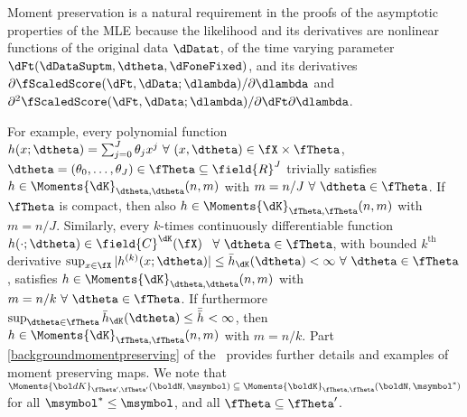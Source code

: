 Moment preservation is a natural requirement in the proofs of the asymptotic properties of the MLE because the likelihood and its derivatives are nonlinear functions of the original data $\dDatat$, of the time varying parameter $\dFt(\dDataSuptm,\dtheta,\dFoneFixed)$, and its derivatives $\partial\fScaledScore(\dFt,\dData;\dlambda)/\partial\dlambda$
and
$\partial^2\fScaledScore(\dFt,\dData;\dlambda)/\partial\dFt\partial\dlambda$.


For example, every polynomial function  $h(x;\dtheta)=\sum_{j=0}^{J} \theta_{j}x^{j} \ \forall \ (x,\dtheta) \in \fX \times \fTheta$, $\dtheta=(\theta_{0},\ldots,\theta_{J}) \in \fTheta \subseteq \field{R}^{J}$ trivially satisfies $h \in \Moments{\dK}_{\dtheta,\dtheta}(n,m)$  with $m=n/J\ \forall \ \dtheta \in \fTheta$. If  $\fTheta$ is compact, then also $h \in \Moments{\dK}_{\fTheta,\fTheta}(n,m)$  with $m=n/J$.
%
%
Similarly, every $k$-times continuously differentiable function $h(\cdot;\dtheta) \in \field{C}^{\dK}(\fX)$ $ \ \forall \ \dtheta \in \fTheta$, with bounded $k^{\text{th}}$ derivative $\sup_{x \in \fX}|h^{(k)}(x;\dtheta)| \leq \bar{h}_{\dK}(\dtheta)<\infty \ \forall \ \dtheta \in \fTheta$, satisfies $h \in \Moments{\dK}_{\dtheta,\dtheta}(n,m)$ with $m=n/k \ \forall \ \dtheta \in \fTheta$. If furthermore $\sup_{\dtheta \in \fTheta}\bar{h}_{\dK}(\dtheta) \leq \bar{\bar{h}}_{}<\infty$, then $h \in \Moments{\dK}_{\fTheta,\fTheta}(n,m)$ with $m=n/k$.
Part \ref{backgroundmomentpreserving} of the \SupplementaryAppendix\ provides further details and examples of moment preserving maps.
We note that
$ \Moments{\bol dK}_{\fTheta',\fTheta'}(\boldN,\msymbol)  
\subseteq \Moments{\boldK}_{\fTheta,\fTheta}(\boldN,\msymbol^{*})$
for all $\msymbol^{*} \leq \msymbol$, and all $\fTheta \subseteq \fTheta'$.



